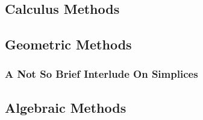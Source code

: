 \subsection{Calculus Methods}



\subsection{Geometric Methods}


\subsubsection{A Not So Brief Interlude On Simplices}




\subsection{Algebraic Methods}



